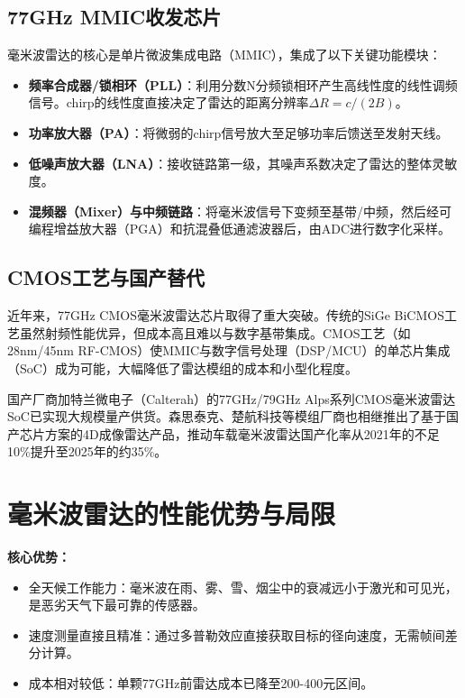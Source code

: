 \documentclass[12pt,a4paper,openany,UTF8]{ctexbook}
\begin{document}
\subsection{77GHz MMIC收发芯片}

毫米波雷达的核心是单片微波集成电路（MMIC），集成了以下关键功能模块：

\begin{itemize}
    \item \textbf{频率合成器/锁相环（PLL）}：利用分数N分频锁相环产生高线性度的线性调频信号。chirp的线性度直接决定了雷达的距离分辨率$\Delta R = c/(2B)$。
    \item \textbf{功率放大器（PA）}：将微弱的chirp信号放大至足够功率后馈送至发射天线。
    \item \textbf{低噪声放大器（LNA）}：接收链路第一级，其噪声系数决定了雷达的整体灵敏度。
    \item \textbf{混频器（Mixer）与中频链路}：将毫米波信号下变频至基带/中频，然后经可编程增益放大器（PGA）和抗混叠低通滤波器后，由ADC进行数字化采样。
\end{itemize}

\subsection{CMOS工艺与国产替代}

近年来，77GHz CMOS毫米波雷达芯片取得了重大突破。传统的SiGe BiCMOS工艺虽然射频性能优异，但成本高且难以与数字基带集成。CMOS工艺（如28nm/45nm RF-CMOS）使MMIC与数字信号处理（DSP/MCU）的单芯片集成（SoC）成为可能，大幅降低了雷达模组的成本和小型化程度。

国产厂商加特兰微电子（Calterah）的77GHz/79GHz Alps系列CMOS毫米波雷达SoC已实现大规模量产供货。森思泰克、楚航科技等模组厂商也相继推出了基于国产芯片方案的4D成像雷达产品，推动车载毫米波雷达国产化率从2021年的不足10\%提升至2025年的约35\%。

\section{毫米波雷达的性能优势与局限}

\textbf{核心优势：}
\begin{itemize}
    \item 全天候工作能力：毫米波在雨、雾、雪、烟尘中的衰减远小于激光和可见光，是恶劣天气下最可靠的传感器。
    \item 速度测量直接且精准：通过多普勒效应直接获取目标的径向速度，无需帧间差分计算。
    \item 成本相对较低：单颗77GHz前雷达成本已降至200-400元区间。
\end{itemize}
\end{document}
